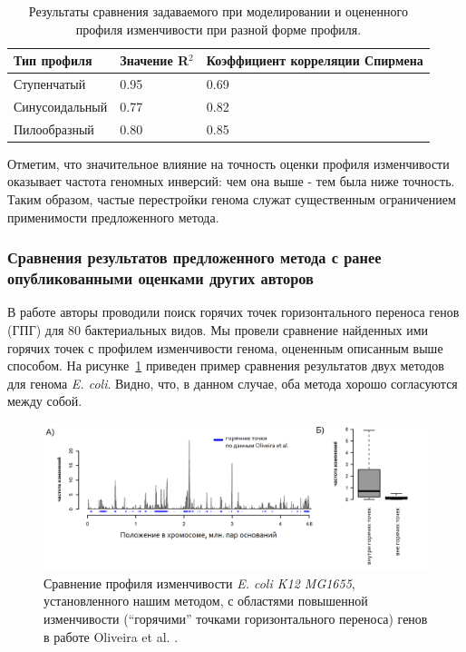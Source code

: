 \begin{table} [htbp]
  \centering
  \parbox{15cm}{%
      \caption{Результаты сравнения задаваемого при моделировании и оцененного профиля изменчивости при разной форме профиля.}\label{simulation_table}%
  }
\begin{tabular}{ | l | l | l | }
\hline
Тип профиля & Значение R$^{2}$ & Коэффициент корреляции Спирмена\\ \hline
Ступенчатый & 0.95 & 0.69 \\ \hline
Синусоидальный & 0.77 & 0.82 \\ \hline
Пилообразный & 0.80 & 0.85 \\ 
\hline
\end{tabular}
\end{table}

Отметим, что значительное влияние на точность оценки профиля изменчивости оказывает частота геномных инверсий: чем она выше - тем была ниже точность. Таким образом, частые перестройки генома служат существенным ограничением применимости предложенного метода. 

\subsubsection{Сравнения результатов предложенного метода с ранее опубликованными оценками других авторов}
В работе \cite{oliveira2017chromosomal} авторы проводили поиск горячих точек горизонтального переноса генов (ГПГ) для 80 бактериальных видов. Мы провели сравнение найденных ими горячих точек с профилем изменчивости генома, оцененным описанным выше способом. На рисунке~\ref{img:rocha_comparison} приведен пример сравнения результатов двух методов для генома \textit{E. coli}. Видно, что, в данном случае, оба метода хорошо согласуются между собой.     

\begin{figure}[!ht] 
  \center
    \includegraphics[width=\textwidth]{Dissertation/images/complexity/rocha_comparepng.png}
  \caption{Сравнение профиля изменчивости \textit{E. coli K12 MG1655}, установленного нашим методом, с областями повышенной изменчивости (``горячими'' точками горизонтального переноса) генов в работе Oliveira et al. \cite{oliveira2017chromosomal}. }
  \label{img:rocha_comparison} 
\end{figure}

